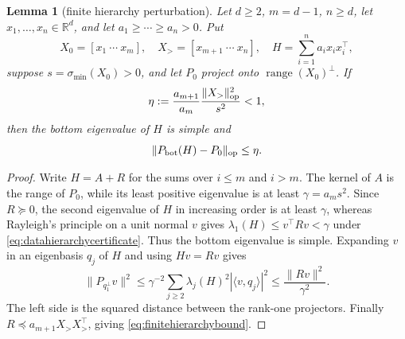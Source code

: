 \documentclass[11pt]{article}
\newtheorem{lemma}[theorem]{Lemma}
\newcommand{\R}{\mathbb R}
\begin{document}
\begin{lemma}[finite hierarchy perturbation]
\label{lem:finitehierarchy}
Let $d\ge2$, $m=d-1$, $n\ge d$, let $x_1,\ldots,x_n\in\R^d$, and let
$a_1\ge\cdots\ge a_n>0$.  Put
\[
 X_0=[x_1\ \cdots\ x_m],\quad X_>=[x_{m+1}\ \cdots\ x_n],\quad
 H=\sum_{i=1}^na_ix_ix_i^\top,
\]
suppose $s=\sigma_{\min}(X_0)>0$, and let $P_0$ project onto $\operatorname{range}(X_0)^\perp$.  If
\begin{equation}
 \eta:=\frac{a_{m+1}}{a_m}\frac{\lVert X_>\rVert_{\rm op}^2}{s^2}<1,
 \label{eq:datahierarchycertificate}
\end{equation}
then the bottom eigenvalue of $H$ is simple and
\begin{equation}
 \lVert P_{\rm bot}(H)-P_0\rVert_{\rm op}\le\eta.
 \label{eq:finitehierarchybound}
\end{equation}
\end{lemma}

\begin{proof}
Write $H=A+R$ for the sums over $i\le m$ and $i>m$.  The kernel of $A$ is the range of $P_0$, while its least
positive eigenvalue is at least $\gamma=a_ms^2$.  Since $R\succeq0$, the second eigenvalue of $H$ in increasing
order is at least $\gamma$, whereas Rayleigh's principle on a unit normal $v$ gives
$\lambda_1(H)\le v^\top Rv<\gamma$ under \eqref{eq:datahierarchycertificate}.  Thus the bottom eigenvalue is
simple.  Expanding $v$ in an eigenbasis $q_j$ of $H$ and using $Hv=Rv$ gives
\[
 \lVert P_{q_1^\perp}v\rVert^2
 \le\gamma^{-2}\sum_{j\ge2}\lambda_j(H)^2|\langle v,q_j\rangle|^2
 \le\frac{\lVert Rv\rVert^2}{\gamma^2}.
\]
The left side is the squared distance between the rank-one projectors.  Finally
$R\preceq a_{m+1}X_>X_>^\top$, giving \eqref{eq:finitehierarchybound}.
\end{proof}
\end{document}
